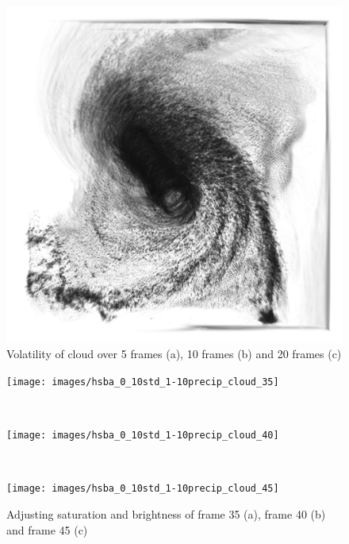 \begin{figure}
\begin{minipage}{.33\textwidth}
	\subcaption{}
\end{minipage}~
\begin{minipage}{.33\textwidth}
	\includegraphics[width=1\linewidth]{figures/hurricane_std20_gray_40}
	\subcaption{}
\end{minipage}
\caption{Volatility of cloud over 5 frames (a), 10 frames (b) and 20 frames (c)}
\label{fig:hurricane_std}
\end{figure}

\begin{figure}
\centering
\begin{minipage}{.33\textwidth}
\texttt{[image: images/hsba\_0\_10std\_1-10precip\_cloud\_35]}
\subcaption{}
\end{minipage}~
\begin{minipage}{.33\textwidth}
\texttt{[image: images/hsba\_0\_10std\_1-10precip\_cloud\_40]}
\subcaption{}
\end{minipage}~
\begin{minipage}{.33\textwidth}
\texttt{[image: images/hsba\_0\_10std\_1-10precip\_cloud\_45]}
\subcaption{}
\end{minipage}
\caption{Adjusting saturation and brightness of frame 35 (a), frame 40 (b) and frame 45 (c)}
\label{fig:hurricane_hsba}
\end{figure}

